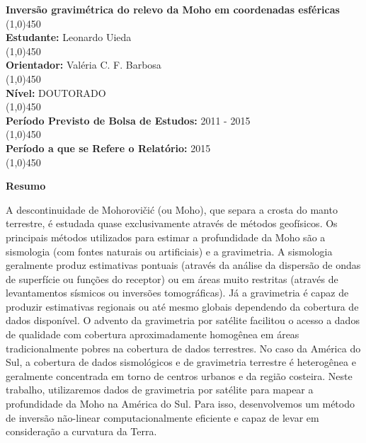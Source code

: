 \documentclass[12pt]{letter}
\begin{document}
\thispagestyle{fancy}

\begin{flushleft}

\textbf{Inversão gravimétrica do relevo da Moho em coordenadas esféricas}\\
\line(1,0){450}
\\\textbf{Estudante:} Leonardo Uieda\\
\line(1,0){450}
\\\textbf{Orientador:} Valéria C. F. Barbosa\\
\line(1,0){450}
\\\textbf{Nível:} DOUTORADO\\
\line(1,0){450}
\\\textbf{Período Previsto de Bolsa de Estudos:} 2011 - 2015\\
\line(1,0){450}
\\\textbf{Período a que se Refere o Relatório:} 2015\\
\line(1,0){450}

\end{flushleft}

\textbf{Resumo}


A descontinuidade de Mohorovičić (ou Moho), que separa a crosta do manto
terrestre, é estudada quase exclusivamente através de métodos geofísicos.
Os principais métodos utilizados para estimar a profundidade da Moho são a
sismologia (com fontes naturais ou artificiais) e a gravimetria.
A sismologia geralmente produz estimativas pontuais (através da análise da
dispersão de ondas de superfície ou funções do receptor) ou em áreas muito
restritas (através de levantamentos sísmicos ou inversões tomográficas).
Já a gravimetria é capaz de produzir estimativas regionais ou até mesmo
globais dependendo da cobertura de dados disponível.
O advento da gravimetria por satélite facilitou o acesso a dados de qualidade
com cobertura aproximadamente homogênea em áreas tradicionalmente pobres na
cobertura de dados terrestres.
No caso da América do Sul, a cobertura de dados sismológicos e de gravimetria
terrestre é heterogênea e geralmente concentrada em torno de centros urbanos e
da região costeira.
Neste trabalho, utilizaremos dados de gravimetria por satélite para mapear a
profundidade da Moho na América do Sul.
Para isso, desenvolvemos um método de inversão não-linear computacionalmente
eficiente e capaz de levar em consideração a curvatura da Terra.
\end{document}
